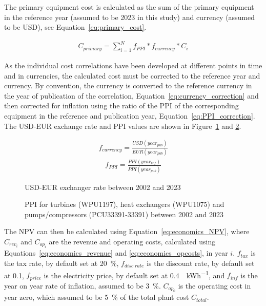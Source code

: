     The primary equipment cost is calculated as the sum of the primary equipment in the reference year (assumed to be 2023 in this study) and currency (assumed to be USD), see Equation~\ref{eq:primary_cost}. 
    
    \begin{align}
        C_{primary} = \sum_{i=1}^N f_{PPI}*f_{currency}*C_i \label{eq:primary_cost}
    \end{align}    
    
    As the individual cost correlations have been developed at different points in time and in currencies, the calculated cost must be corrected to the reference year and currency. By convention, the currency is converted to the reference currency in the year of publication of the correlation, Equation~\ref{eq:currency_correction} and then corrected for inflation using the ratio of the \ac{PPI} of the corresponding equipment in the reference and publication year, Equation~\ref{eq:PPI_correction}. The USD-EUR exchange rate and PPI values are shown in Figure~\ref{fig:USD_EUR_exchange_rate} and \ref{fig:PPI_correction}.

    \begin{align}
        f_{currency} = \frac{USD(year_{pub})}{EUR(year_{pub})} \label{eq:currency_correction}
    \end{align}
    \begin{align}
        f_{PPI} = \frac{PPI(year_{ref})}{PPI(year_{pub})} \label{eq:PPI_correction}
    \end{align}

    \begin{figure}[H]
        \centering
        
        \caption{USD-EUR exchanger rate between 2002 and 2023 \cite{Macrotrends2024}}
        \label{fig:USD_EUR_exchange_rate}
    \end{figure}

    \begin{figure}[H]
        \centering
        
        \caption{PPI for turbines (WPU1197), heat exchangers (WPU1075) and pumps/compressors (PCU33391-33391) between 2002 and 2023 \cite{US_BLS2024}}
        \label{fig:PPI_correction}
    \end{figure}

    The \ac{NPV} can then be calculated using Equation~\ref{eq:economics_NPV}, where \(C_{rev_i}\) and \(C_{op_i}\) are the revenue and operating costs, calculated using Equations~\ref{eq:economics_revenue} and \ref{eq:economics_opcosts}, in year \(i\). \(f_{tax}\) is the tax rate, by default set at \qty{20}{\percent}, \(f_{disc\;rate}\) is the discount rate, by default set at \num{0.1}, \(f_{price}\) is the electricity price, by default set at \qty{0.4}{\USD\per\kWh}, and \(f_{inf}\) is the year on year rate of inflation, assumed to be \qty{3}{\percent}. \(C_{op_0}\) is the operating cost in year zero, which assumed to be \qty{5}{\percent} of the total plant cost \(C_{total}\).

